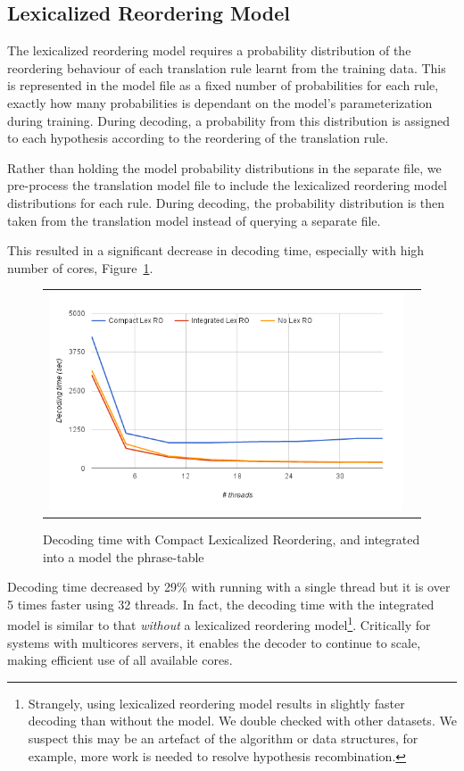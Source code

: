 \documentclass[11pt]{article}
\begin{document}
\subsection{Lexicalized Reordering Model}

The lexicalized reordering model requires a probability distribution of the reordering behaviour of each translation rule learnt from the training data. This is represented in the model file as a fixed number of probabilities for each rule, exactly how many probabilities is dependant on the model's parameterization during training. During decoding, a probability from this distribution is assigned to each hypothesis according to the reordering of the translation rule.

Rather than holding the model probability distributions in the separate file, we pre-process the translation model file to include the lexicalized reordering model distributions for each rule. During decoding, the probability distribution is then taken from the translation model instead of querying a separate file. 

This resulted in a significant decrease in decoding time, especially with high number of cores, Figure~\ref{fig:lex-ro}. 
\begin{figure}[h]
\centering
\begin{tabular}{cc}
{\includegraphics[scale=0.4]{lex-ro.png}} 
\end{tabular}
\caption{Decoding time with Compact Lexicalized Reordering, and integrated into a model the phrase-table}
\label{fig:lex-ro}
\end{figure} 
Decoding time decreased by 29\% with running with a single thread but it is over 5 times faster using 32 threads. In fact, the decoding time with the integrated model is similar to that \emph{without} a lexicalized reordering model\footnote{Strangely, using lexicalized reordering model results in slightly faster decoding than without the model. We double checked with other datasets. We suspect this may be an artefact of the algorithm or data structures, for example, more work is needed to resolve hypothesis recombination.}. Critically for systems with multicores servers, it enables the decoder to continue to scale, making efficient use of all available cores. 
\end{document}
